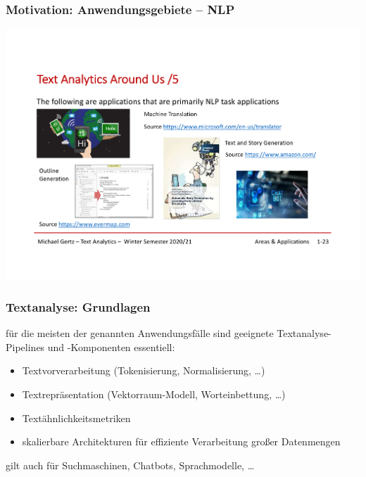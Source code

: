 
\begin{frame}[c]
    \frametitle{Motivation: Anwendungsgebiete -- NLP}

    \centering\includegraphics[width=\textwidth]{fig8/motivation-5.pdf}
\end{frame}


\begin{frame}
    \frametitle{Textanalyse: Grundlagen}

    für die meisten der genannten Anwendungsfälle sind geeignete Textanalyse-Pipelines und -Komponenten essentiell:

    \begin{itemize}
    \item Textvorverarbeitung (Tokenisierung, Normalisierung, \dots)
    \item Textrepräsentation (Vektorraum-Modell, Worteinbettung, \dots)
    \item Textähnlichkeitsmetriken
    \item skalierbare Architekturen für effiziente Verarbeitung großer Datenmengen
    \end{itemize}

    gilt auch für Suchmaschinen, Chatbots, Sprachmodelle, \dots
\end{frame}


